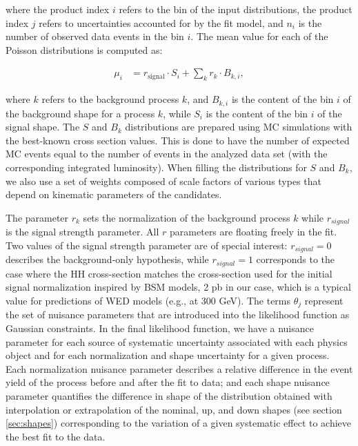 \noindent where the product index $i$ refers to the bin of the input distributions, the product index $j$
refers to uncertainties accounted for by the fit model, and $n_i$ is the number of observed data
events in the bin $i$. The mean value for each of the Poisson distributions is computed as:

\begin{align*}
\mu_{i} &= r_{\text{signal}} \cdot S_{i} + \sum_{k}r_{k}\cdot B_{k,i},
\end{align*}

\noindent where $k$ refers to the background process $k$, and $B_{k,i}$ is the content of the bin $i$ of the background
shape for a process $k$, while $S_i$ is the content of the bin $i$ of the signal shape. The $S$ and $B_k$ distributions are prepared using MC simulations with the best-known cross section values. This is done to have the number of expected MC events equal to the number of events in the analyzed data set (with the corresponding integrated luminosity). When filling the distributions for $S$ and $B_k$, we also use a set of weights composed of scale factors of various types that depend on kinematic parameters of the candidates.

The parameter $r_k$ sets the normalization of the background process $k$ while $r_{signal}$ is the signal strength parameter. All $r$ parameters are floating freely in the fit. Two values of the signal strength parameter are of special interest: $r_{signal} = 0$ describes the background-only hypothesis, while $r_{signal} = 1$ corresponds to the case where the HH cross-section matches the cross-section used for the initial signal normalization inspired by BSM models, 2 pb in our case, which is a typical value for predictions of WED models (e.g., at 300 GeV). The terms $\theta_j$ represent the set of nuisance parameters that are introduced into the likelihood function as Gaussian constraints. In the final likelihood function, we have a nuisance parameter for each source of systematic uncertainty associated with each physics object and for each normalization and shape uncertainty for a given process. Each normalization nuisance parameter describes a relative difference in the event yield of the process before and after the fit to data; and each shape nuisance parameter quantifies the difference in shape of the \mTHH distribution obtained with interpolation or extrapolation of the nominal, up, and down shapes (see section \ref{sec:shapes}) corresponding to the variation of a given systematic effect to achieve the best fit to the data.

